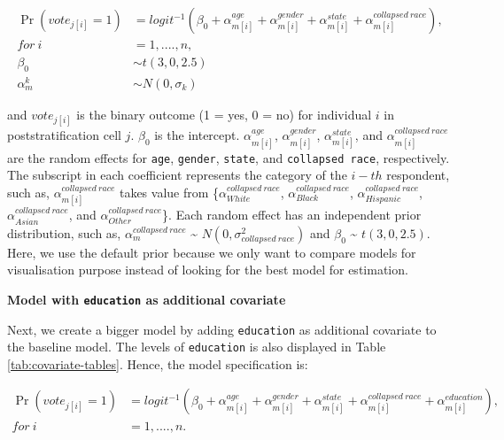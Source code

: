 \documentclass{monashthesis}
\begin{document}
\begin{equation} 
\begin{split}
\Pr(vote_{j[i]} = 1) & = logit^{-1}\left(\beta_0 + \alpha^{age}_{m[i]} + \alpha^{gender}_{m[i]} + \alpha^{state}_{m[i]} + \alpha^{collapsed\ race}_{m[i]}\right), \\
for\ i  & = 1, ...., n, \\
\beta_0  & \sim t(3,0,2.5) \\
\alpha^k_m  & \sim N(0,\sigma_k)
\end{split}
\label{eq:baseline-model}
\end{equation}

and \(vote_{j[i]}\) is the binary outcome (1 = yes, 0 = no) for individual \(i\) in poststratification cell \(j\). \(\beta_0\) is the intercept. \(\alpha^{age}_{m[i]}\), \(\alpha^{gender}_{m[i]}\), \(\alpha^{state}_{m[i]}\), and \(\alpha^{collapsed\ race}_{m[i]}\) are the random effects for \texttt{age}, \texttt{gender}, \texttt{state}, and \texttt{collapsed\ race}, respectively. The subscript in each coefficient represents the category of the \(i-th\) respondent, such as, \(\alpha^{collapsed\ race}_{m[i]}\) takes value from \{\(\alpha^{collapsed\ race}_{White}\), \(\alpha^{collapsed\ race}_{Black}\), \(\alpha^{collapsed\ race}_{Hispanic}\), \(\alpha^{collapsed\ race}_{Asian}\), and \(\alpha^{collapsed\ race}_{Other}\)\}. Each random effect has an independent prior distribution, such as, \(\alpha^{collapsed\ race}_{m}\) \textasciitilde{} \(N(0, \sigma^2_{collapsed\ race})\) and \(\beta_0\) \textasciitilde{} \(t(3, 0, 2.5)\). Here, we use the default prior because we only want to compare models for visualisation purpose instead of looking for the best model for estimation.

\vspace{\baselineskip}

\textbf{Model with \texttt{education} as additional covariate}

Next, we create a bigger model by adding \texttt{education} as additional covariate to the baseline model. The levels of \texttt{education} is also displayed in Table \ref{tab:covariate-tables}. Hence, the model specification is:

\begin{equation} 
\begin{split}
\Pr(vote_{j[i]} = 1) &= logit^{-1}\left(\beta_0 + \alpha^{age}_{m[i]} + \alpha^{gender}_{m[i]} + \alpha^{state}_{m[i]} + \alpha^{collapsed\ race}_{m[i]} + \alpha^{education}_{m[i]}\right), \\
for\ i &= 1, ...., n.
\end{split}
\label{eq:model2}
\end{equation}
\end{document}

